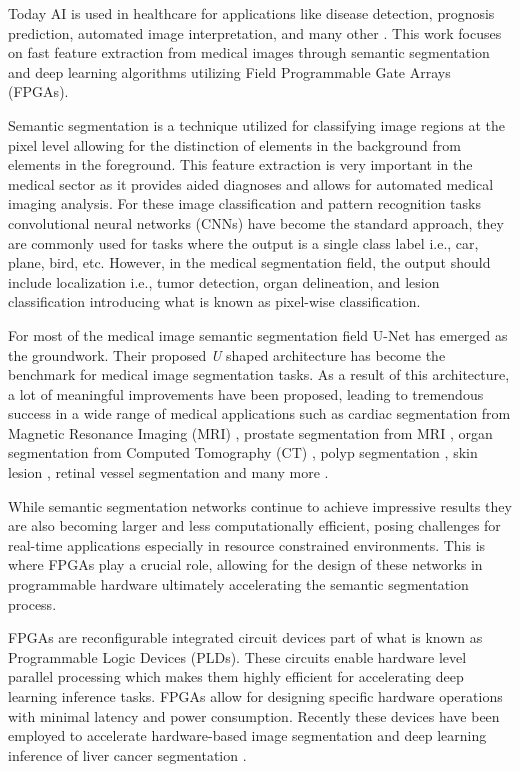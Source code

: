 \documentclass[lettersize,journal]{IEEEtran}
\begin{document}
Today AI is used in healthcare for applications like disease detection, prognosis prediction, automated image interpretation, and many other \cite{wang2019ai}.
This work focuses on fast feature extraction from medical images through semantic segmentation and deep learning algorithms utilizing Field Programmable Gate Arrays (FPGAs).

Semantic segmentation is a technique utilized for classifying image regions at the pixel level allowing for the distinction of elements in the background from elements in the foreground. This feature extraction is very important in the medical sector as it provides aided diagnoses and allows for automated medical imaging analysis. For these image classification and pattern recognition tasks convolutional neural networks (CNNs) have become the standard approach, they are commonly used for tasks where the output is a single class label i.e., car, plane, bird, etc. However, in the medical segmentation field, the output should include localization i.e., tumor detection, organ delineation, and lesion classification \cite{fu2021review} introducing what is known as pixel-wise classification. 

For most of the medical image semantic segmentation field U-Net \cite{ronneberger2015u} has emerged as the groundwork. Their proposed \textit{U} shaped architecture has become the benchmark for medical image segmentation tasks. As a result of this architecture, a lot of meaningful improvements have been proposed, leading to tremendous success in a wide range of medical applications such as cardiac segmentation from Magnetic Resonance Imaging (MRI) \cite{yu2017automatic}, prostate segmentation from MRI \cite{milletari2016v}, organ segmentation from Computed Tomography (CT) \cite{peng2023u, irshad2023improved, wang2023swinmm}, polyp segmentation \cite{zhou2018unet++}, skin lesion \cite{tang2024cmunext, chang2024unext}, retinal vessel segmentation \cite{lou2023cfpnet} and many more \cite{wang2022medical}.

While semantic segmentation networks continue to achieve impressive results they are also becoming larger and less computationally efficient, posing challenges for real-time applications especially in resource constrained environments. This is where FPGAs play a crucial role, allowing for the design of these networks in programmable hardware ultimately accelerating the semantic segmentation process.

FPGAs are reconfigurable integrated circuit devices part of what is known as Programmable Logic Devices (PLDs). These circuits enable hardware level parallel processing which makes them highly efficient for accelerating deep learning inference tasks. FPGAs allow for designing specific hardware operations with minimal latency and power consumption. Recently these devices have been employed to accelerate hardware-based image segmentation \cite{liu2020fast} and deep learning inference of liver cancer segmentation \cite{xu2024fpga}.    
\end{document}
